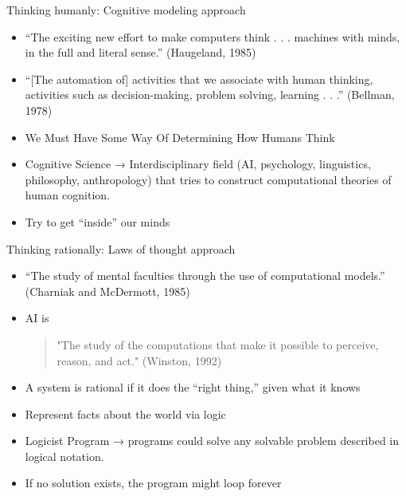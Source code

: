 \documentclass{beamer}
\begin{document}
\begin{frame}{Thinking humanly: Cognitive modeling approach}
\begin{itemize}
    \item “The exciting new effort to make computers think . . . machines with minds, in the full and literal sense.”
    (Haugeland, 1985)
    \item “[The automation of] activities that we associate with human thinking, activities such as decision-making, problem solving, learning . . .”
    (Bellman, 1978)
    \item We Must Have Some Way Of Determining How Humans Think
    \item Cognitive Science → Interdisciplinary field (AI, psychology, linguistics, philosophy, anthropology) that tries to construct computational theories of human cognition.
    \item Try to get “inside” our minds
\end{itemize}
\end{frame}

\begin{frame}{Thinking rationally: Laws of thought approach}
\begin{itemize}
    \item “The study of mental faculties through the use of computational models.”
    (Charniak and McDermott, 1985)
    \item AI is
    \begin{quote}
        "The study of the computations that make it possible to perceive, reason, and act."
    (Winston, 1992)
    \end{quote}
    \item A system is rational if it does the “right thing,” given what it knows
    \item Represent facts about the world via logic
    \item Logicist Program → programs could solve any solvable problem described in logical notation.
    \item If no solution exists, the program might loop forever
\end{itemize}
\end{frame}
\end{document}
